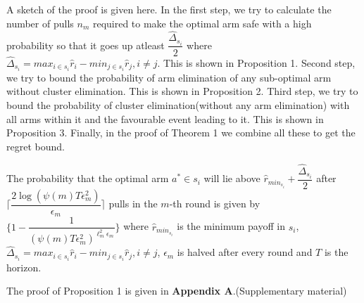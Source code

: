 \begin{remark}
A sketch of the proof is given here. In the first step, we try to calculate the number of pulls $n_{m}$ required to make the optimal arm  safe with a high probability so that it goes up atleast $\dfrac{\hat{\Delta}_{s_{i}}}{2}$ where $\hat{\Delta}_{s_{i}}=max_{i\in s_{i}}\hat{r}_{i}-min_{j\in s_{i}}\hat{r}_{j},i\neq j$. This is shown in Proposition 1. Second step, we try to bound the probability of arm elimination of any sub-optimal arm without cluster elimination. This is shown in Proposition 2. Third step, we try to bound the probability of cluster elimination(without any arm elimination) with all arms within it and the favourable event leading to it. This is shown in Proposition 3. Finally, in the proof of Theorem 1 we combine all these to get the regret bound.  
\end{remark}
	
\begin{proposition}
The probability that the optimal arm $a^{*}\in s_{i}$ will lie above $\hat{r}_{min_{s_{i}}}+ \dfrac{\hat{\Delta}_{s_{i}}}{2}$ after $\bigg\lceil\dfrac{2\log (\psi(m)T\epsilon_{m}^{2})}{\epsilon_{m}}\bigg\rceil$ pulls in the $m$-th round is given by $\bigg\lbrace 1- \dfrac{1}{(\psi(m)T\epsilon_{m}^{2})^{\ell_{m}^{2}\epsilon_{m}}} \bigg\rbrace$ where $\hat{r}_{min_{s_{i}}}$ is the minimum payoff in $s_{i}$, $\hat{\Delta}_{s_{i}}=max_{i\in s_{i}}\hat{r}_{i}-min_{j\in s_{i}}\hat{r}_{j}, i\neq j$, $\epsilon_{m}$ is halved after every round and $T$ is the horizon. 
\end{proposition}


	The proof of Proposition 1 is given in \textbf{Appendix A}.(Supplementary material)


